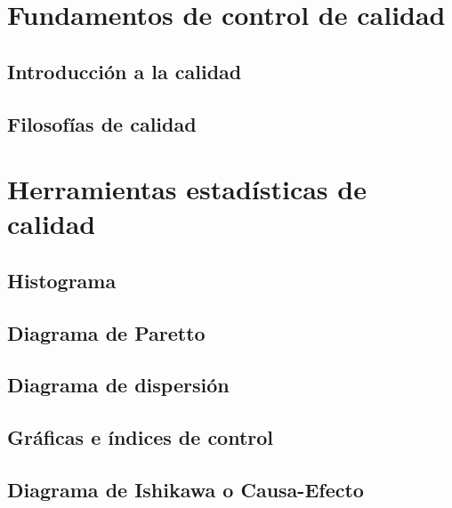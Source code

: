 \documentclass{AsignaturaResumen}
\begin{document}
    \frontmatter

\Portada
\Indices

    \mainmatter


\part{Fundamentos de control de calidad}
    
    \chapter{Introducción a la calidad} 
    \chapter{Filosofías de calidad} 

\part{Herramientas estadísticas de calidad}

    \chapter{Histograma} 
    \chapter{Diagrama de Paretto} 
    \chapter{Diagrama de dispersión} 
    \chapter{Gráficas e índices de control} 
    \chapter{Diagrama de Ishikawa o Causa-Efecto} 
\end{document}
